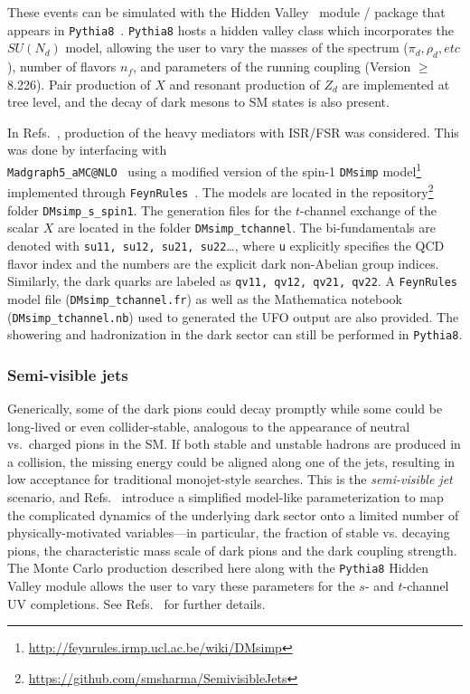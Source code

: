 
These events can be simulated with the Hidden Valley~\cite{Carloni:2010tw} module / package that appears in \texttt{Pythia8}~\cite{Sjostrand:2014zea}. \texttt{Pythia8} hosts a hidden valley class which incorporates the $SU(N_{d})$ model, allowing the user to vary the masses of the spectrum ($\pi_{d}, \rho_{d}, etc$), number of flavors $n_{f}$, and parameters of the running coupling (Version $\geq$ 8.226). Pair production of $X$ and resonant production of $Z_d$ are implemented at tree level, and the decay of dark mesons to SM states is also present.

In Refs.~\cite{Cohen:2017pzm,Linthorne:2018abc}, production of the heavy mediators with ISR/FSR was considered. This was done by interfacing with\\
 \texttt{Madgraph5\_aMC@NLO}~\cite{Alwall:2014hca} using a modified version of the spin-1 \texttt{DMsimp} model\footnote{\url{http://feynrules.irmp.ucl.ac.be/wiki/DMsimp}} implemented through \texttt{FeynRules}~\cite{Alloul:2013bka}. The models are located in the repository\footnote{\url{https://github.com/smsharma/SemivisibleJets}} folder \texttt{DMsimp\_s\_spin1}. The generation files for the $t$-channel exchange of the scalar $X$ are located in the folder \texttt{DMsimp\_tchannel}. The bi-fundamentals are denoted with \texttt{su11, su12, su21, su22}\ldots, where \texttt{u} explicitly specifies the QCD flavor index and the numbers are the explicit dark non-Abelian group indices. Similarly, the dark quarks are labeled as \texttt{qv11, qv12, qv21, qv22}. A \texttt{FeynRules} model file (\texttt{DMsimp\_tchannel.fr}) as well as the Mathematica notebook (\texttt{DMsimp\_tchannel.nb}) used to generated the UFO output are also provided. The showering and hadronization in the dark sector can still be performed in \texttt{Pythia8}.


\subsubsection{Semi-visible jets}

Generically, some of the dark pions could decay promptly while some could be long-lived or even collider-stable, analogous to the appearance of neutral vs.~charged pions in the SM. If both stable and unstable hadrons are produced in a collision, the missing energy could be aligned along one of the jets, resulting in low acceptance for traditional monojet-style searches. This is the {\em semi-visible jet} scenario, and Refs.~\cite{Cohen:2015toa,Cohen:2017pzm} introduce a simplified model-like parameterization to map the complicated dynamics of the underlying dark sector onto a limited number of physically-motivated variables---in particular, the fraction of stable vs. decaying pions, the characteristic mass scale of dark pions and the dark coupling strength. The Monte Carlo production described here along with the \texttt{Pythia8} Hidden Valley module allows the user to vary these parameters for the $s$- and $t$-channel UV completions. See Refs.~\cite{Cohen:2015toa,Cohen:2017pzm} for further details.

